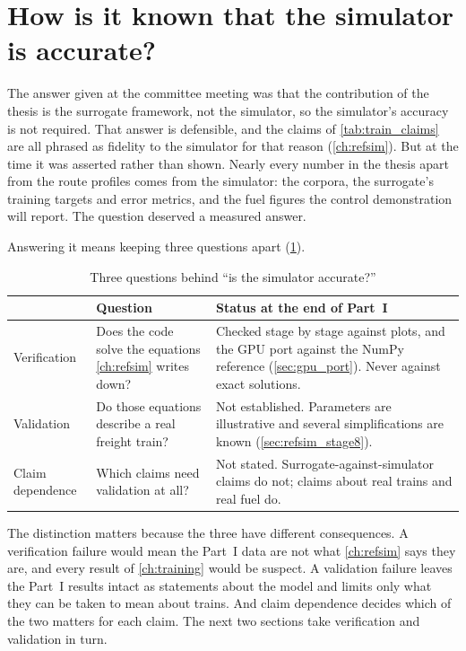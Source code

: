 \section{How is it known that the simulator is accurate?}
\label{sec:critique_question}

The answer given at the committee meeting was that the contribution of the thesis is the surrogate framework, not the simulator, so the simulator's accuracy is not required. That answer is defensible, and the claims of \cref{tab:train_claims} are all phrased as fidelity to the simulator for that reason (\cref{ch:refsim}). But at the time it was asserted rather than shown. Nearly every number in the thesis apart from the route profiles comes from the simulator: the corpora, the surrogate's training targets and error metrics, and the fuel figures the control demonstration will report. The question deserved a measured answer.

Answering it means keeping three questions apart (\cref{tab:critique_three_questions}).

\begin{table}[htbp]
    \centering
    \small
    \begin{tabular}{>{\raggedright}p{2.4cm}>{\raggedright}p{5.6cm}>{\raggedright\arraybackslash}p{5.6cm}}
        \toprule
        & Question & Status at the end of Part~I \\
        \midrule
        Verification & Does the code solve the equations \cref{ch:refsim} writes down? & Checked stage by stage against plots, and the GPU port against the NumPy reference (\cref{sec:gpu_port}). Never against exact solutions. \\
        Validation & Do those equations describe a real freight train? & Not established. Parameters are illustrative and several simplifications are known (\cref{sec:refsim_stage8}). \\
        Claim dependence & Which claims need validation at all? & Not stated. Surrogate-against-simulator claims do not; claims about real trains and real fuel do. \\
        \bottomrule
    \end{tabular}
    \caption{Three questions behind ``is the simulator accurate?''}
    \label{tab:critique_three_questions}
\end{table}

The distinction matters because the three have different consequences. A verification failure would mean the Part~I data are not what \cref{ch:refsim} says they are, and every result of \cref{ch:training} would be suspect. A validation failure leaves the Part~I results intact as statements about the model and limits only what they can be taken to mean about trains. And claim dependence decides which of the two matters for each claim. The next two sections take verification and validation in turn.

